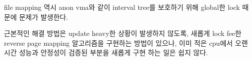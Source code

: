 
\ifkor
file mapping 역시 anon vma와 같이 interval tree를  보호하기 위해 global한 lock
때문에 문제가 발생한다.
\else
\fi





\ifkor
근본적인 해결 방법은 update heavy한 상황이 발생하지 않도록, 새롭게 lock fee한 reverse  page mapping
알고리즘을 구현하는 방법이 있으나, 
이미 적은 cpu에서 오랜 시간 성능과 안정성이 검증된 부분을 새롭게 구현 하는 일은 쉽지 않다. 
\else
\fi



\ifkor
\else
\fi





\ifkor
\else
\fi















